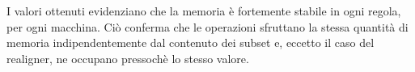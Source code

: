 \begin{table}[H]
\centering
{}
\caption{Media e deviazione standard, espresse in MB, della memoria occupata dalle regole su diversi subset da centomila letture.}
\label{varM}
\end{table}

I valori ottenuti evidenziano che la memoria è fortemente stabile in ogni regola, per ogni macchina.
Ciò conferma che le operazioni sfruttano la stessa quantità di memoria indipendentemente dal contenuto dei subset e, eccetto il caso del realigner, ne occupano pressochè lo stesso valore. 


